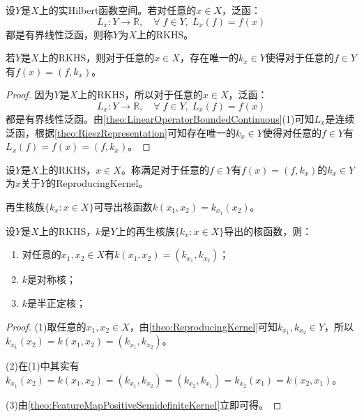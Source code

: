 \begin{definition}
	设$Y$是$X$上的实Hilbert函数空间。若对任意的$x\in X$，泛函：
	\begin{equation*}
		L_x:Y\to\mathbb{R},\quad\forall\;f\in Y,\;L_x(f)=f(x)
	\end{equation*}
	都是有界线性泛函，则称$Y$为$X$上的\gls{RKHS}。
\end{definition}
\begin{theorem}\label{theo:ReproducingKernel}
	若$Y$是$X$上的RKHS，则对于任意的$x\in X$，存在唯一的$k_x\in Y$使得对于任意的$f\in Y$有$f(x)=(f,k_x)$。
\end{theorem}
\begin{proof}
	因为$Y$是$X$上的RKHS，所以对于任意的$x\in X$，泛函：
	\begin{equation*}
		L_x:Y\to\mathbb{R},\quad\forall\;f\in Y,\;L_x(f)=f(x)
	\end{equation*}
	都是有界线性泛函。由\cref{theo:LinearOperatorBoundedContinuous}(1)可知$L_x$是连续泛函，根据\cref{theo:RieszRepresentation}可知存在唯一的$k_x\in Y$使得对任意的$f\in Y$有$L_x(f)=f(x)=(f,k_x)$。
\end{proof}
\begin{definition}
	设$Y$是$X$上的RKHS，$x\in X$。称满足对于任意的$f\in Y$有$f(x)=(f,k_x)$的$k_x\in Y$为$x$关于$Y$的\gls{ReproducingKernel}。
\end{definition}
\begin{note}
	再生核族$\{k_x:x\in X\}$可导出核函数$k(x_1,x_2)=k_{x_1}(x_2)$。
\end{note}
\begin{property}\label{prop:ReproducingKernel}
	设$Y$是$X$上的RKHS，$k$是$Y$上的再生核族$\{k_x:x\in X\}$导出的核函数，则：
	\begin{enumerate}
		\item 对任意的$x_1,x_2\in X$有$k(x_1,x_2)=(k_{x_1},k_{x_2})$；
		\item $k$是对称核；
		\item $k$是半正定核；
	\end{enumerate}
\end{property}
\begin{proof}
	(1)取任意的$x_1,x_2\in X$，由\cref{theo:ReproducingKernel}可知$k_{x_1},k_{x_2}\in Y$，所以$k_{x_1}(x_2)=k(x_1,x_2)=(k_{x_1},k_{x_2})$。\par
	(2)在(1)中其实有$k_{x_1}(x_2)=k(x_1,x_2)=(k_{x_1},k_{x_2})=(k_{x_2},k_{x_1})=k_{x_2}(x_1)=k(x_2,x_1)$。\par
	(3)由\cref{theo:FeatureMapPositiveSemidefiniteKernel}立即可得。
\end{proof}
